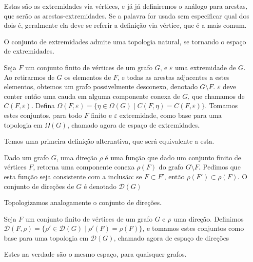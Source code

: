 \documentclass[11pt]{article}
\renewcommand{\textit}[1]{{\fakeitalic#1}}
\newcommand{\pulinho}{\vspace{.5cm}}
\theoremstyle{definition}
\theoremstyle{definition}
\theoremstyle{definition}
\theoremstyle{definition}
\theoremstyle{definition}
\theoremstyle{definition}
\theoremstyle{definition}
\theoremstyle{definition}
\newtheorem*{definition*}{Definição}
\newenvironment{definicao*}{
\definecolor{shadecolor}{HTML}{defcfc}
\begin{shaded}
\begin{definition*}
}
{
\end{definition*}
\end{shaded}
}
\theoremstyle{definition}
\theoremstyle{definition}
\theoremstyle{definition}
\theoremstyle{definition}
\begin{document}
Estas são as extremidades via vértices, e já já definiremos o análogo para arestas, que serão as arestas-extremidades. Se a palavra for usada sem especificar qual dos dois é, geralmente ela deve se referir a definição via vértice, que é a mais comum. 

\pulinho

O conjunto de extremidades admite uma topologia natural, se tornando o espaço de extremidades.

\begin{definicao*}
    Seja $F$ um conjunto finito de vértices de um grafo $G$, e $\varepsilon$ uma extremidade de $G$. Ao retirarmos de $G$ os elementos de $F$, e todas as arestas adjacentes a estes elementos, obtemos um grafo possivelmente desconexo, denotado $G \setminus F$. $\varepsilon$ deve conter então uma cauda em alguma componente conexa de $G$, que chamamos de $C(F,\varepsilon)$. Defina $\Omega(F,\varepsilon) = \{\eta \in \Omega(G) \mid C(F,\eta) = C(F,\varepsilon)\}$. Tomamos estes conjuntos, para todo $F$ finito e $\varepsilon$ extremidade, como base para uma topologia em $\Omega(G)$, chamado agora de \textit{espaço de extremidades}.
\end{definicao*}

Temos uma primeira definição alternativa, que será equivalente a esta.

\begin{definicao*}[Direções]
    Dado um grafo $G$, uma \textit{direção} $\rho$ é uma função que dado um conjunto finito de vértices $F$, retorna uma componente conexa $\rho(F)$ do grafo $G \setminus F$. Pedimos que esta função seja consistente com a inclusão: se $F \subset F'$, então $\rho(F') \subset \rho(F)$. O conjunto de direções de $G$ é denotado $\mathcal{D}(G)$
\end{definicao*}

Topologizamos analogamente o conjunto de direções.

\begin{definicao*}
    Seja $F$ um conjunto finito de vértices de um grafo $G$ e $\rho$ uma direção. Definimos $\mathcal{D}(F,\rho) = \{\rho' \in \mathcal{D}(G) \mid \rho'(F) = \rho(F)\}$, e tomamos estes conjuntos como base para uma topologia em $\mathcal{D}(G)$, chamado agora de \textit{espaço de direções}
\end{definicao*}

Estes na verdade são o mesmo espaço, para quaisquer grafos.
\end{document}
